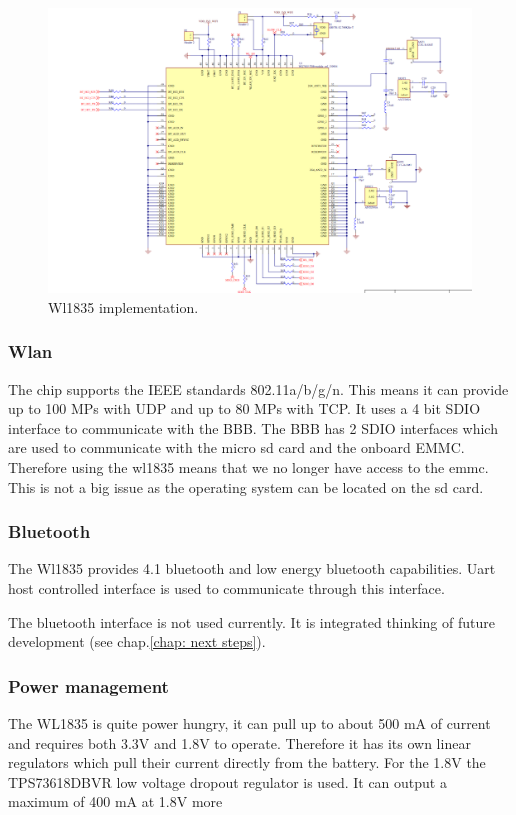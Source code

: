 \begin{figure}[!htb]
    \centering
    \includegraphics[width=1\textwidth,keepaspectratio]{chap/hardFig/wl1835_chip_sch}
    \caption{Wl1835 implementation.}
    \label{fig:wl1835 chip}
\end{figure}

\subsubsection{Wlan}
The chip supports the IEEE standards 802.11a/b/g/n. This means it can provide up to 100 MPs with UDP and up to 80 MPs with TCP.
It uses a 4 bit SDIO interface to communicate with the BBB. The BBB has 2 SDIO interfaces which are used to communicate with the micro sd card and the onboard EMMC. Therefore using the wl1835 means that we no longer have access to the emmc. This is not a big issue as the operating system can be located on the sd card.


\subsubsection{Bluetooth}
The Wl1835 provides 4.1 bluetooth and low energy bluetooth capabilities. Uart host controlled interface is used to communicate through this interface.

The bluetooth interface is not used currently. It is integrated thinking of future development (see chap.\ref{chap: next steps}).

\subsubsection{Power management}
The WL1835 is quite power hungry, it can pull up to about 500 mA of current and requires both 3.3V and 1.8V to operate. Therefore it has its own linear regulators which pull their current directly from the battery. For the 1.8V the TPS73618DBVR low voltage dropout regulator is used. It can output a maximum of 400 mA at 1.8V more

